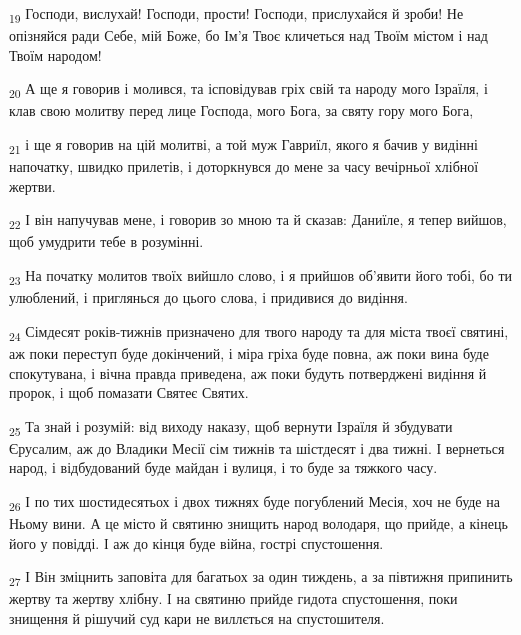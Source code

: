 \begin{tcolorbox}
\textsubscript{19} Господи, вислухай! Господи, прости! Господи, прислухайся й зроби! Не опізняйся ради Себе, мій Боже, бо Ім'я Твоє кличеться над Твоїм містом і над Твоїм народом!
\end{tcolorbox}
\begin{tcolorbox}
\textsubscript{20} А ще я говорив і молився, та ісповідував гріх свій та народу мого Ізраїля, і клав свою молитву перед лице Господа, мого Бога, за святу гору мого Бога,
\end{tcolorbox}
\begin{tcolorbox}
\textsubscript{21} і ще я говорив на цій молитві, а той муж Гавриїл, якого я бачив у видінні напочатку, швидко прилетів, і доторкнувся до мене за часу вечірньої хлібної жертви.
\end{tcolorbox}
\begin{tcolorbox}
\textsubscript{22} І він напучував мене, і говорив зо мною та й сказав: Даниїле, я тепер вийшов, щоб умудрити тебе в розумінні.
\end{tcolorbox}
\begin{tcolorbox}
\textsubscript{23} На початку молитов твоїх вийшло слово, і я прийшов об'явити його тобі, бо ти улюблений, і приглянься до цього слова, і придивися до видіння.
\end{tcolorbox}
\begin{tcolorbox}
\textsubscript{24} Сімдесят років-тижнів призначено для твого народу та для міста твоєї святині, аж поки переступ буде докінчений, і міра гріха буде повна, аж поки вина буде спокутувана, і вічна правда приведена, аж поки будуть потверджені видіння й пророк, і щоб помазати Святеє Святих.
\end{tcolorbox}
\begin{tcolorbox}
\textsubscript{25} Та знай і розумій: від виходу наказу, щоб вернути Ізраїля й збудувати Єрусалим, аж до Владики Месії сім тижнів та шістдесят і два тижні. І вернеться народ, і відбудований буде майдан і вулиця, і то буде за тяжкого часу.
\end{tcolorbox}
\begin{tcolorbox}
\textsubscript{26} І по тих шостидесятьох і двох тижнях буде погублений Месія, хоч не буде на Ньому вини. А це місто й святиню знищить народ володаря, що прийде, а кінець його у повідді. І аж до кінця буде війна, гострі спустошення.
\end{tcolorbox}
\begin{tcolorbox}
\textsubscript{27} І Він зміцнить заповіта для багатьох за один тиждень, а за півтижня припинить жертву та жертву хлібну. І на святиню прийде гидота спустошення, поки знищення й рішучий суд кари не виллється на спустошителя.
\end{tcolorbox}
